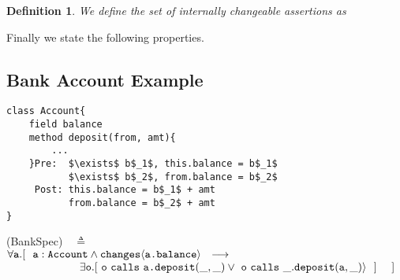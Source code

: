 \documentclass[12pt]{article}
\newtheorem{definition}{Definition}
\begin{document}
\begin{definition}
We define the set of internally changeable assertions as
\end{definition}
Finally we state the following properties.

\subsection{Bank Account Example}

\begin{lstlisting}[mathescape=true]
class Account{
	field balance
	method deposit(from, amt){
		...
	}Pre:  $\exists$ b$_1$, this.balance = b$_1$
	       $\exists$ b$_2$, from.balance = b$_2$
	 Post: this.balance = b$_1$ + amt
	       from.balance = b$_2$ + amt
}
\end{lstlisting}
 
  \vspace{.01in}
(BankSpec)\ \  $\triangleq$\\ 
$\forall \texttt{a}.[\ \ \texttt{a}:\texttt{Account} \wedge \texttt{changes}\langle{\texttt{a.balance}}\rangle  \ \    
    \longrightarrow \ \    \hfill$ \\
  $\strut \hspace{2.3cm} 
  \exists \texttt{o}. [\    \texttt{o}\ \texttt{calls}\ {\texttt{a.}}{\texttt{deposit}}({\_,\_}) \vee\  \texttt{o}\ \texttt{calls}\ {\_.}{\texttt{deposit}}({\texttt{a},\_})\rangle\  \ ] \ \ \ \ ] \hfill $
\vspace{.05in}
\end{document}
